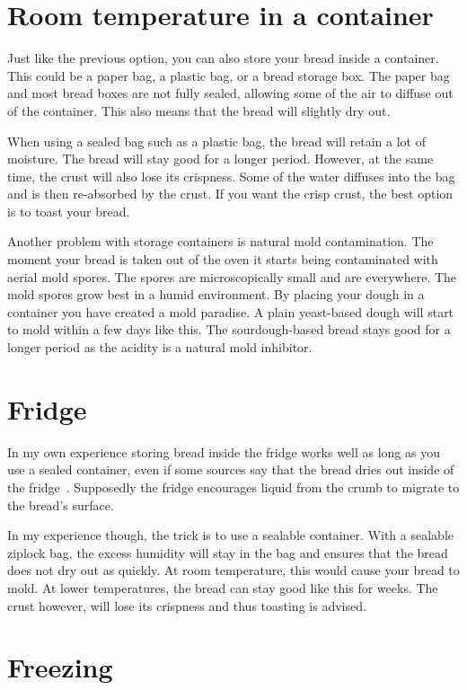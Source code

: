 \section{Room temperature in a container}

Just like the previous option, you can also store your
bread inside a container. This could be a paper bag,
a plastic bag, or a bread storage box. The paper bag and
most bread boxes are not fully sealed, allowing some of
the air to diffuse out of the container. This also means that
the bread will slightly dry out.

When using a sealed bag such as a plastic bag, the bread
will retain a lot of moisture. The bread will stay good
for a longer period. However, at the same time, the crust
will also lose its crispness. Some of the water diffuses
into the bag and is then re-absorbed by the crust. If
you want the crisp crust, the best option is to toast your
bread.

Another problem with storage containers is natural
mold contamination. The moment your bread is taken out of
the oven it starts being contaminated with aerial mold spores.
The spores are microscopically small and are everywhere.
The mold spores grow best in a humid environment. By placing
your dough in a container you have created a mold paradise.
A plain yeast-based dough will start to mold within a few days
like this. The sourdough-based bread stays good
for a longer period as the acidity is a natural mold
inhibitor.

\section{Fridge}

In my own experience storing bread inside the fridge
works well as long as you use a sealed container, even if some
sources say that the bread dries out inside of the
fridge~\cite{storing+bread}. Supposedly the fridge
encourages liquid from the crumb to migrate to the bread's surface.

In my experience though, the trick is to use a sealable
container. With a sealable ziplock bag,
the excess humidity will stay in the bag and ensures
that the bread does not dry out as quickly. At room
temperature, this would cause your bread to mold. At
lower temperatures, the bread can stay good like this for
weeks. The crust however, will lose its crispness and
thus toasting is advised.

\section{Freezing}

